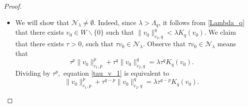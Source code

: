 \documentclass[10pt,a4paper]{amsart}
\begin{document}
\begin{proof}

\begin{itemize}
    \item[(i)] We will show that $\mathcal{N}_{\lambda}\ne \emptyset$. Indeed,
since $\lambda>\Lambda_{q}$, it follows from  \eqref{Lambda_q}  that there exists $v_{0} \in W \backslash\{0\}$ such that $\|v_0\|_{c_2,q}^q<\lambda K_q(v_{0})$. 
We claim that there exists $\tau>0$, such that $\tau v_{0} \in \mathcal{N}_{\lambda}$.  Observe that  $\tau v_{0} \in \mathcal{N}_{\lambda}$ means  that 
\begin{equation}\label{tau_v_1}
    \tau^{p} \|v_0\|_{c_1,p}^p+\tau^{q} \|v_0 \|_{c_2,q}^q=\lambda \tau^{q}K_q(v_{0}).
\end{equation}
Dividing  by $\tau^{p},$ equation \eqref{tau_v_1} is equivalent to 
\begin{equation}\label{tau_v_2}
    \|v_0 \|_{c_1,p}^p+\tau^{q-p} \|v_0 \|_{c_2,q}^q=\lambda \tau^{q-p}K_q(v_{0}).\end{equation}


\end{itemize}
\end{proof}
\end{document}
